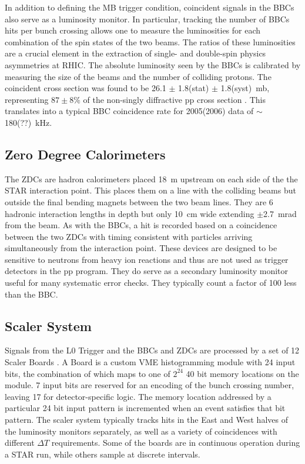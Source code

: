 In addition to defining the MB trigger condition, coincident signals in the
BBCs also serve as a luminosity monitor. In particular, tracking the number of
BBCs hits per bunch crossing allows one to measure the luminosities for each
combination of the spin states of the two beams. The ratios of these
luminosities are a crucial element in the extraction of single- and
double-spin physics asymmetries at RHIC. The absolute luminosity seen by the
BBCs is calibrated by measuring the size of the beams and the number of
colliding protons. The coincident cross section was found to be 26.1 $\pm$
1.8(stat) $\pm$ 1.8(syst)~mb, representing $87\pm8\%$ of the non-singly
diffractive pp cross section \cite{Adams:2003kv}. This translates into a
typical BBC coincidence rate for 2005(2006) data of $\sim$180(??)~kHz.

\subsection{Zero Degree Calorimeters\label{sec:zdc}}

The ZDCs \cite{Adler:2003sp} are hadron calorimeters placed 18~m upstream on
each side of the the STAR interaction point. This places them on a line with
the colliding beams but outside the final bending magnets between the two beam
lines. They are 6 hadronic interaction lengths in depth but only 10~cm wide
extending $\pm$2.7~mrad from the beam. As with the BBCs, a hit is recorded
based on a coincidence between the two ZDCs with timing consistent with
particles arriving simultaneously from the interaction point. These devices
are designed to be sensitive to neutrons from heavy ion reactions and thus are
not used as trigger detectors in the pp program. They do serve as a secondary
luminosity monitor useful for many systematic error checks. They typically
count a factor of 100 less than the BBC.

\subsection{Scaler System\label{sec:scalers}}

Signals from the L0 Trigger and the BBCs and ZDCs are processed by a set of 12
Scaler Boards \cite{scalers}. A Board is a custom VME histogramming module with
24 input bits, the combination of which maps to one of \(2^{24}\) 40 bit memory
locations on the module. 7 input bits are reserved for an encoding of the bunch
crossing number, leaving 17 for detector-specific logic. The memory location
addressed by a particular 24 bit input pattern is incremented when an event
satisfies that bit pattern. The scaler system typically tracks hits in the East
and West halves of the luminosity monitors separately, as well as a variety of
coincidences with different \(\Delta T\) requirements. Some of the boards are in
continuous operation during a STAR run, while others sample at discrete
intervals.

